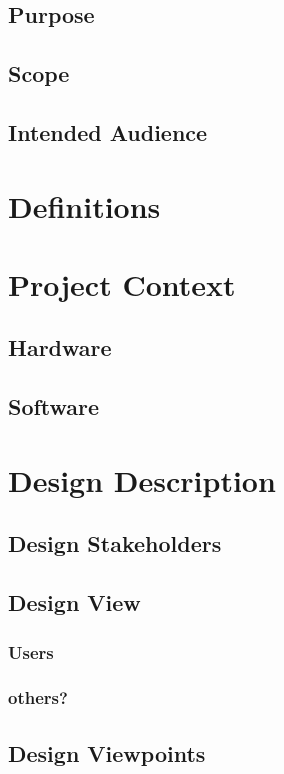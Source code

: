 \documentclass[onecolumn, draftclsnofoot,10pt, compsoc]{IEEEtran}
\begin{document}
\subsection{Purpose}
\subsection{Scope}
\subsection{Intended Audience}
\section{Definitions}


\section{Project Context}
\subsection{Hardware}
\subsection{Software}

\section{Design Description}
\subsection{Design Stakeholders}
\subsection{Design View}
\subsubsection{Users}
\subsubsection{others?}%
\subsection{Design Viewpoints}
\end{document}
